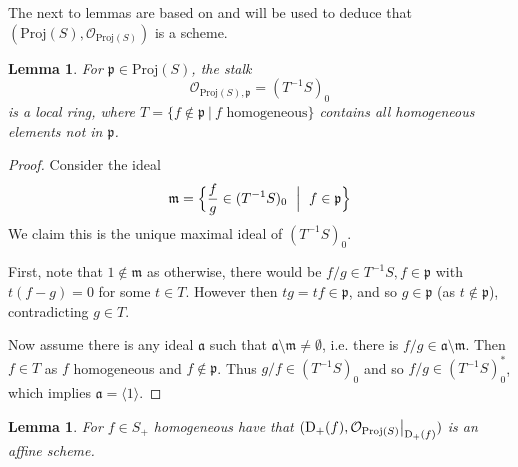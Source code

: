 \documentclass{scrartcl}
\newcommand{\D}[1]{\mathrm{D}_+(#1)}
\newcommand{\p}{\mathfrak{p}}
\newcommand{\m}{\mathfrak{m}}
\renewcommand{\a}{\mathfrak{a}}
\renewcommand{\m}{\mathfrak{m}}
\newcommand{\Proj}{\mathrm{Proj}}
\renewcommand{\O}{\mathcal{O}}
\newcommand\restr[2]{{
    \left.\kern-\nulldelimiterspace
    #1
    \vphantom{\big|}
    \right|_{#2}
}}
\newtheorem{lemma}[subsection]{Lemma}
\theoremstyle{definition}
\begin{document}
The next to lemmas are based on \cite[Prop. II.2.5]{hartshorne} and will be used to deduce that $(\Proj(S), \O_{\Proj(S)})$ is a scheme.
\begin{lemma}
    For $\p \in \Proj(S)$, the stalk
    \begin{equation*}
        \O_{\Proj(S), \p} = (T^{-1}S)_0
    \end{equation*}
    is a local ring, where $T = \{ f \notin \p \ | \ \text{$f$ homogeneous}\}$ contains all homogeneous elements not in $\p$.
\end{lemma}
\begin{proof}
    Consider the ideal
    \begin{equation*}
        \m = \Bigl\{ \frac f g \in (T^{-1}S)_0 \ \Bigm| \ f \in \p \Bigr\}
    \end{equation*}
    We claim this is the unique maximal ideal of $(T^{-1}S)_0$.

    First, note that $1 \notin \m$ as otherwise, there would be $f/g \in T^{-1}S, f \in \p$ with $t(f - g) = 0$ for some $t \in T$.
    However then $tg = tf \in \p$, and so $g \in \p$ (as $t \notin \p$), contradicting $g \in T$.
    
    Now assume there is any ideal $\a$ such that $\a \setminus \m \neq \emptyset$, i.e. there is $f/g \in \a \setminus \m$.
    Then $f \in T$ as $f$ homogeneous and $f \notin \p$.
    Thus $g/f \in (T^{-1}S)_0$ and so $f/g \in (T^{-1}S)_0^*$, which implies $\a = \langle 1 \rangle$.
\end{proof}
\begin{lemma}
    \label{prop:Df_affine}
    For $f \in S_+$ homogeneous have that $(\D{f}, \restr{\O_{\Proj(S)}}{\D{f}})$ is an affine scheme.
\end{lemma}
\end{document}
